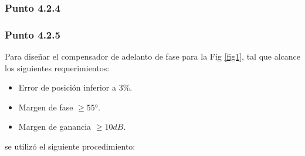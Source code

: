 \documentclass[twocolumn]{IEEEtran}
\begin{document}
\subsubsection{Punto 4.2.4}

\subsubsection{Punto 4.2.5}
\noindent
Para diseñar el compensador de adelanto de fase para la Fig \ref{fig1}, tal que alcance los siguientes requerimientos:
\begin{itemize}
 \item Error de posición inferior a $3 \%$.
 \item Margen de fase $\geq 55°$.
 \item Margen de ganancia $\geq 10dB$.
\end{itemize}
\noindent
se utilizó el siguiente procedimiento:
\end{document}
